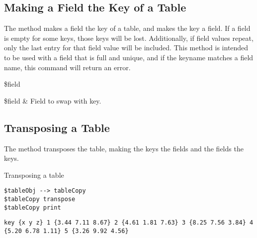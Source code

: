 \documentclass{article}
\begin{document}
\clearpage

\subsection{Making a Field the Key of a Table}
The method  makes a field the key of a table, and makes the key a field. 
If a field is empty for some keys, those keys will be lost. 
Additionally, if field values repeat, only the last entry for that field value will be included. 
This method is intended to be used with a field that is full and unique, and if the keyname matches a field name, this command will return an error.
\begin{syntax}
 \$field
\end{syntax}
\begin{args}
\$field & Field to swap with key.
\end{args}

\subsection{Transposing a Table}
The method  transposes the table, making the keys the fields and the fields the keys.
\begin{syntax}
\end{syntax}

\begin{example}{Transposing a table}
\begin{lstlisting}
$tableObj --> tableCopy
$tableCopy transpose
$tableCopy print
\end{lstlisting}
\tcblower
\begin{lstlisting}
key {x y z} 1 {3.44 7.11 8.67} 2 {4.61 1.81 7.63} 3 {8.25 7.56 3.84} 4 {5.20 6.78 1.11} 5 {3.26 9.92 4.56}
\end{lstlisting}
\end{example}
{\normalsize\printindex}
\end{document}
